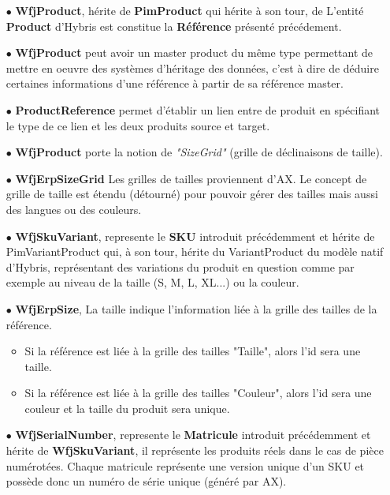 \begin{itemize}
    \item[$\bullet$] \textbf{WfjProduct}, hérite de \textbf{PimProduct} qui hérite à son tour, de L'entité \textbf{Product} d'Hybris est constitue la \textbf{Référence} présenté précédement.
    \medskip
    \item[$\bullet$] \textbf{WfjProduct} peut avoir un master product du même type permettant de mettre en oeuvre des systèmes d'héritage des données, c'est à dire de déduire certaines informations d'une référence à partir de sa référence master.
    \medskip
    \item[$\bullet$] \textbf{ProductReference} permet d'établir un lien entre de produit en spécifiant le type de ce lien et les deux produits source et target.
    \medskip
    \item[$\bullet$] \textbf{WfjProduct} porte la notion de \textit{"SizeGrid"} (grille de déclinaisons de taille).
    \medskip
    \item[$\bullet$] \textbf{WfjErpSizeGrid} Les grilles de tailles proviennent d'AX. Le concept de grille de taille est étendu (détourné) pour pouvoir gérer des tailles mais aussi des langues ou des couleurs.
    \medskip
    \item[$\bullet$] \textbf{WfjSkuVariant}, represente le \textbf{SKU} introduit précédemment et hérite de PimVariantProduct qui, à son tour, hérite du VariantProduct du modèle natif d'Hybris, représentant des variations du produit en question comme par exemple au niveau de la taille (S, M, L, XL...) ou la couleur.
    \medskip
    \item[$\bullet$] \textbf{WfjErpSize}, La taille indique l'information liée à la grille des tailles de la référence.
    \begin{itemize}
        \smallskip
        \item Si la référence est liée à la grille des tailles "Taille", alors l'id sera une taille.
                \smallskip
        \item Si la référence est liée à la grille des tailles "Couleur", alors l'id sera une couleur et la taille du produit sera unique.
    \end{itemize}
    \medskip
     \item[$\bullet$] \textbf{WfjSerialNumber}, represente le \textbf{Matricule} introduit précédemment et hérite de \textbf{WfjSkuVariant}, il représente les produits réels dans le cas de pièce numérotées. Chaque matricule représente une version unique d'un SKU et possède donc un numéro de série unique (généré par AX).
\end{itemize}

